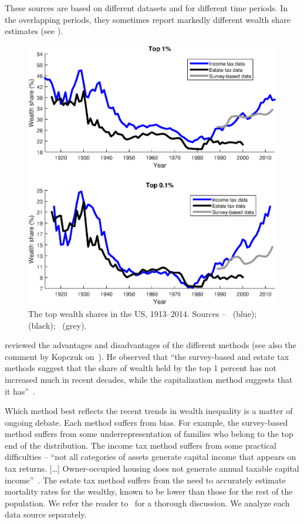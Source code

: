 These sources are based on different datasets and for different time periods. In the overlapping periods, they sometimes report markedly different wealth share estimates (see ).

\begin{figure}[!htb]
\centering
\includegraphics[width=1.0\textwidth] {./chapter_3/figs/data.eps}
\caption{The top wealth shares in the US, 1913--2014. Sources --~\cite{SaezZucman2014,WID2017} (blue);~\cite{kopczuk2004top} (black);~\cite{bricker2016measuring2} (grey).}
\end{figure}

\cite{kopczuk2015we} reviewed the advantages and disadvantages of the different methods (see also the comment by Kopczuk on~\cite{bricker2016measuring2}). He observed that ``the survey-based and estate tax methods suggest that the share of wealth held by the top 1 percent has not increased much in recent decades, while the capitalization method suggests that it has''~\cite[p.~48] {kopczuk2015we}.

Which method best reflects the recent trends in wealth inequality is a matter of ongoing debate. Each method suffers from bias. For example, the survey-based method suffers from some underrepresentation of families who belong to the top end of the distribution. The income tax method suffers from some practical difficulties -- ``not all categories of assets generate capital income that appears on tax returns. [\ldots] Owner-occupied housing does not generate annual taxable capital income''~\cite[p. 54] {kopczuk2015we}. The estate tax method suffers from the need to accurately estimate mortality rates for the wealthy, known to be lower than those for the rest of the population. We refer the reader to~\cite{kopczuk2015we,bricker2016measuring2} for a thorough discussion. We analyze each data source separately.

